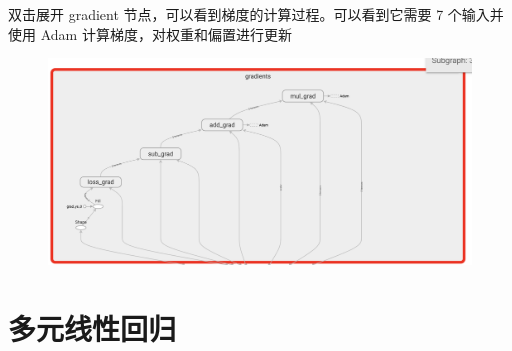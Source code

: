 \documentclass[12pt]{article}
\begin{document}
双击展开 gradient 节点，可以看到梯度的计算过程。可以看到它需要 7 个输入并使用 Adam 计算梯度，对权重和偏置进行更新
\begin{figure}[H]
    \centering
    \includegraphics[width=1\textwidth]{fig/codes/tf_simple_linear_regression_4.png}
\end{figure}

\section{多元线性回归}
\end{document}
